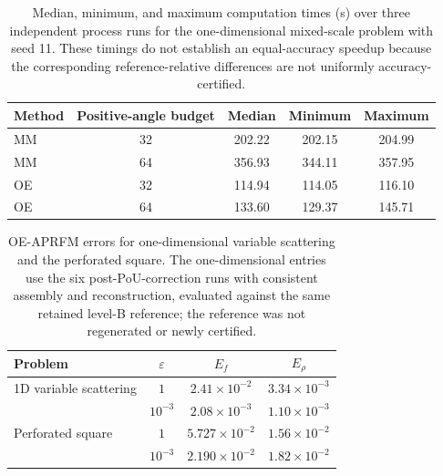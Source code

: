 \begin{table}[!htb]
\centering
\small
\setlength{\tabcolsep}{9pt}
\caption{Median, minimum, and maximum computation times (s) over three independent process runs for the one-dimensional mixed-scale problem with seed 11. These timings do not establish an equal-accuracy speedup because the corresponding reference-relative differences are not uniformly accuracy-certified.}
\label{tab:mixed-timing}
\begin{tabular}{lcccc}
\toprule
Method & Positive-angle budget & Median & Minimum & Maximum \\
\midrule
MM & 32 & 202.22 & 202.15 & 204.99 \\
MM & 64 & 356.93 & 344.11 & 357.95 \\
OE & 32 & 114.94 & 114.05 & 116.10 \\
OE & 64 & 133.60 & 129.37 & 145.71 \\
\bottomrule
\end{tabular}
\end{table}

\begin{table}[!htb]
\centering\small
\setlength{\tabcolsep}{7pt}
\caption{OE-APRFM errors for one-dimensional variable scattering and the perforated square. The one-dimensional entries use the six post-PoU-correction runs with consistent assembly and reconstruction, evaluated against the same retained level-B reference; the reference was not regenerated or newly certified.}
\label{tab:extended}
\begin{tabular}{lccc}
\toprule
Problem & $\varepsilon$ & $E_f$ & $E_\rho$\\
\midrule
1D variable scattering & $1$ & $2.41\times10^{-2}$ & $3.34\times10^{-3}$\\
 & $10^{-3}$ & $2.08\times10^{-3}$ & $1.10\times10^{-3}$\\
\addlinespace
Perforated square & $1$ & $5.727\times10^{-2}$ & $1.56\times10^{-2}$\\
 & $10^{-3}$ & $2.190\times10^{-2}$ & $1.82\times10^{-2}$\\
\bottomrule
\end{tabular}
\end{table}

